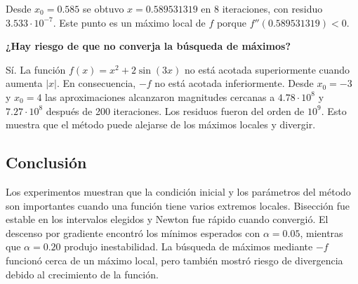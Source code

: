 \documentclass[12pt]{article}
\begin{document}
\begin{table}[h]
\centering
{}
\caption{Descenso por gradiente aplicado a $-f$ para buscar máximos de $f$.}
\label{tab:maximos-parte3}
\end{table}

Desde $x_0=0.585$ se obtuvo $x=0.589531319$ en 8 iteraciones, con residuo $3.533\cdot10^{-7}$. Este punto es un máximo local de $f$ porque $f''(0.589531319)<0$.

\textbf{¿Hay riesgo de que no converja la búsqueda de máximos?}

Sí. La función $f(x)=x^2+2\sin(3x)$ no está acotada superiormente cuando aumenta $|x|$. En consecuencia, $-f$ no está acotada inferiormente. Desde $x_0=-3$ y $x_0=4$ las aproximaciones alcanzaron magnitudes cercanas a $4.78\cdot10^8$ y $7.27\cdot10^8$ después de 200 iteraciones. Los residuos fueron del orden de $10^9$. Esto muestra que el método puede alejarse de los máximos locales y divergir.

\subsection{Conclusión}

Los experimentos muestran que la condición inicial y los parámetros del método son importantes cuando una función tiene varios extremos locales. Bisección fue estable en los intervalos elegidos y Newton fue rápido cuando convergió. El descenso por gradiente encontró los mínimos esperados con $\alpha=0.05$, mientras que $\alpha=0.20$ produjo inestabilidad. La búsqueda de máximos mediante $-f$ funcionó cerca de un máximo local, pero también mostró riesgo de divergencia debido al crecimiento de la función.
\end{document}
